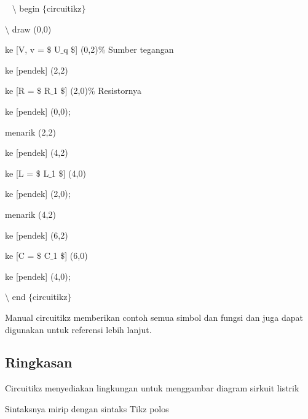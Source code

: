 \noindent 
~ $\setminus$ begin $ \{ $circuitikz$ \} $
\par


\noindent 
 $\setminus$ draw (0,0)
\par


\noindent 
 ke [V, v = $\$$ U$ \_ $q $\$$] (0,2)$\%$ Sumber tegangan
\par


\noindent 
 ke [pendek] (2,2)
\par


\noindent 
 ke [R = $\$$ R$ \_ $1 $\$$] (2,0)$\%$ Resistornya
\par


\noindent 
 ke [pendek] (0,0);
\par


\noindent 
 menarik (2,2)
\par


\noindent 
 ke [pendek] (4,2)
\par


\noindent 
 ke [L = $\$$ L$ \_ $1 $\$$] (4,0)
\par


\noindent 
 ke [pendek] (2,0);
\par


\noindent 
 menarik (4,2)
\par


\noindent 
 ke [pendek] (6,2)
\par


\noindent 
 ke [C = $\$$ C$ \_ $1 $\$$] (6,0)
\par


\noindent 
 ke [pendek] (4,0);
\par


\noindent 
 $\setminus$ end $ \{ $circuitikz$ \} $ 
\par


\noindent 
Manual circuitikz memberikan contoh semua simbol dan fungsi dan juga dapat digunakan untuk referensi lebih lanjut.
\par

\subsection{Ringkasan}


\noindent 
Circuitikz menyediakan lingkungan untuk menggambar diagram sirkuit listrik
\par


\noindent 
Sintaksnya mirip dengan sintaks Tikz polos
\par


